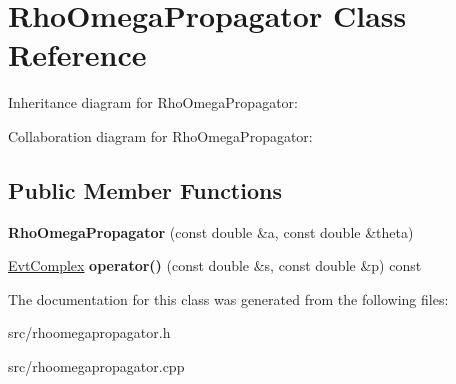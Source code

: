 \hypertarget{class_rho_omega_propagator}{}\section{Rho\+Omega\+Propagator Class Reference}
\label{class_rho_omega_propagator}


Inheritance diagram for Rho\+Omega\+Propagator\+:


Collaboration diagram for Rho\+Omega\+Propagator\+:
\subsection*{Public Member Functions}
\begin{DoxyCompactItemize}
\item 
\hypertarget{class_rho_omega_propagator_a7fe781dd50b6dd376c7636957f38554b}{}{\bfseries Rho\+Omega\+Propagator} (const double \&a, const double \&theta)\label{class_rho_omega_propagator_a7fe781dd50b6dd376c7636957f38554b}

\item 
\hypertarget{class_rho_omega_propagator_a1fc1d978245f6c927b0446ba45fba140}{}\hyperlink{class_evt_complex}{Evt\+Complex} {\bfseries operator()} (const double \&s, const double \&p) const \label{class_rho_omega_propagator_a1fc1d978245f6c927b0446ba45fba140}

\end{DoxyCompactItemize}


The documentation for this class was generated from the following files\+:\begin{DoxyCompactItemize}
\item 
src/rhoomegapropagator.\+h\item 
src/rhoomegapropagator.\+cpp\end{DoxyCompactItemize}
